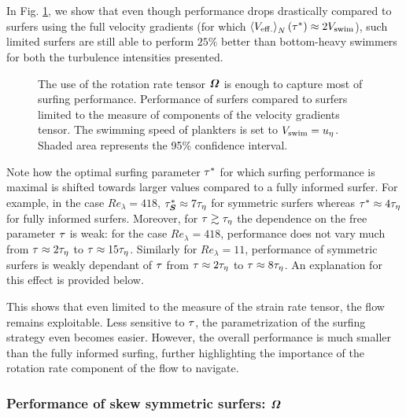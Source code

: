 In Fig. \ref{fig:surfing_partial}, we show that even though performance drops drastically compared to surfers using the full velocity gradients (for which $\left\langle V_{\mathrm{eff.}} \right\rangle_{N}(\tau^*) \approx 2 V_{\mathrm{swim}}$), such limited surfers are still able to perform $25\%$ better than bottom-heavy swimmers for both the turbulence intensities presented.
\begin{figure}%
	\centering
	
	\caption[The use of the rotation rate tensor $\GradientsAsym$ is enough to capture most of surfing performance.]{
		The use of the rotation rate tensor $\GradientsAsym$ is enough to capture most of surfing performance.
		Performance of surfers compared to surfers limited to the measure of components of the velocity gradients tensor.
		The swimming speed of plankters is set to $V_{\mathrm{swim}} = u_{\eta}$.
		Shaded area represents the 95\% confidence interval.
	}
	\label{fig:surfing_partial}
\end{figure}
Note how the optimal surfing parameter $\tau^*$ for which surfing performance is maximal is shifted towards larger values compared to a fully informed surfer.
For example, in the case $\mathit{Re}_{\lambda} = 418$, $\tau^*_{\boldsymbol{S}} \approx 7 \tau_{\eta}$ for symmetric surfers whereas $\tau^* \approx 4 \tau_{\eta}$ for fully informed surfers.
Moreover, for $\tau \gtrsim \tau_{\eta}$ the dependence on the free parameter $\tau$ is weak: for the case $\mathit{Re}_{\lambda} = 418$, performance does not vary much from $\tau \approx 2 \tau_{\eta}$ to $\tau \approx 15 \tau_{\eta}$.
Similarly for $\mathit{Re}_{\lambda} = 11$, performance of symmetric surfers is weakly dependant of $\tau$ from $\tau \approx 2 \tau_{\eta}$ to $\tau \approx 8 \tau_{\eta}$.
An explanation for this effect is provided below.

This shows that even limited to the measure of the strain rate tensor, the flow remains exploitable.
Less sensitive to $\tau$, the parametrization of the surfing strategy even becomes easier.
However, the overall performance is much smaller than the fully informed surfing, further highlighting the importance of the rotation rate component of the flow to navigate.

\subsubsection{Performance of skew symmetric surfers: $\GradientsAsym$}

